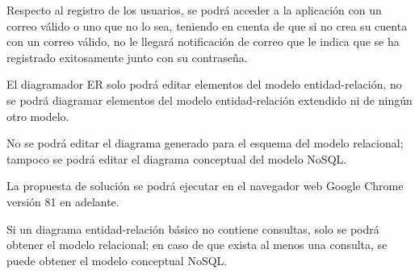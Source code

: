 Respecto al registro de los usuarios, se podrá acceder a la aplicación con un correo válido o uno que no lo sea, teniendo en cuenta de que si no crea su cuenta con un correo válido, no le llegará notificación de correo que le indica que se ha registrado exitosamente junto con su contraseña.


El diagramador ER solo podrá editar elementos del modelo entidad-relación, no se podrá diagramar elementos del modelo entidad-relación extendido ni de ningún otro modelo.


No se podrá editar el diagrama generado para el esquema del modelo relacional; tampoco se podrá editar el diagrama conceptual del modelo NoSQL.


La propuesta de solución se podrá ejecutar en el navegador web Google Chrome versión 81 en adelante.


Si un diagrama entidad-relación básico no contiene consultas, solo se podrá obtener el modelo relacional; en caso de que exista al menos una consulta, se puede obtener el modelo conceptual NoSQL.
    